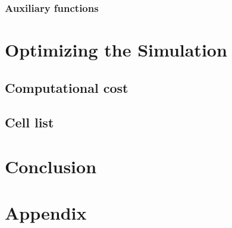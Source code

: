 \documentclass[]{usiinfbachelorproject}
\begin{document}
\subsubsection{Auxiliary functions}

\newpage
\section{Optimizing the Simulation}
\subsection{Computational cost}
\subsection{Cell list}

\newpage
\section{Conclusion}

\newpage
\section{Appendix}

\newpage


\end{document}
